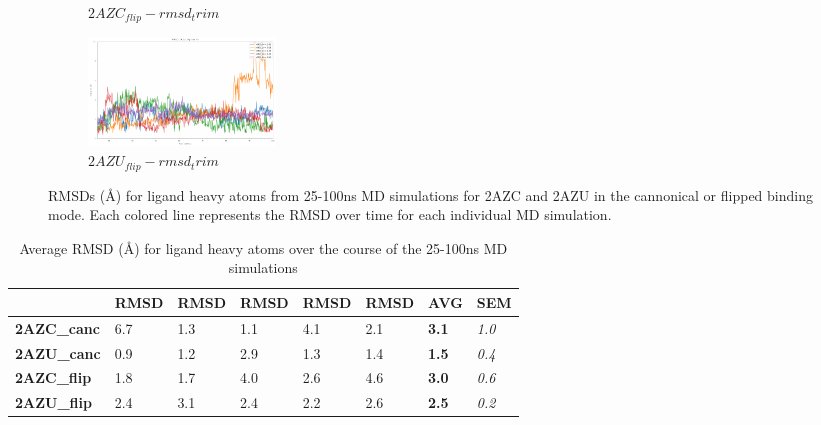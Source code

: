 \begin{figure}[!ht]
\begin{subfigure}{.45\textwidth}
     \caption{$2AZC_{flip}-rmsd_trim$}
     \label{fig:2AZC_flip-rmsd_trim}
   \end{subfigure}
    \begin{subfigure}{.45\textwidth}
     \centering
     \includegraphics[width=.95\linewidth]{chapter4/2AZU_flip/2AZU_flip-rmsd-trim}
     \caption{$2AZU_{flip}-rmsd_trim$}
     \label{fig:2AZU_flip-rmsd_trim}
   \end{subfigure}
\caption[RMSD for 2AZC and 2AZU]{RMSDs ({\AA}) for ligand heavy atoms from 25-100ns MD simulations for 2AZC and 2AZU in the cannonical or flipped binding mode. Each colored line represents the RMSD over time for each individual MD simulation.}
\label{fig:rmsd}
\end{figure}  

\begin{table}[!ht]
\caption{Average RMSD ({\AA}) for ligand heavy atoms over the course of the 25-100ns MD simulations}
\label{table:rmsd}
\begin{tabular}{|l|l|l|l|l|l|l|l|}
\hline
                    & RMSD & RMSD & RMSD & RMSD & RMSD & \textbf{AVG}  & SEM           \\ \hline
\textbf{2AZC\_canc} & 6.7 & 1.3 & 1.1 & 4.1 & 2.1 & \textbf{3.1} & \textit{1.0} \\ \hline
\textbf{2AZU\_canc} & 0.9 & 1.2 & 2.9 & 1.3 & 1.4 & \textbf{1.5} & \textit{0.4} \\ \hline
\textbf{2AZC\_flip} & 1.8 & 1.7 & 4.0 & 2.6 & 4.6 & \textbf{3.0} & \textit{0.6} \\ \hline
\textbf{2AZU\_flip} & 2.4 & 3.1 & 2.4 & 2.2 & 2.6 & \textbf{2.5} & \textit{0.2} \\ \hline

\end{tabular}
\end{table}

